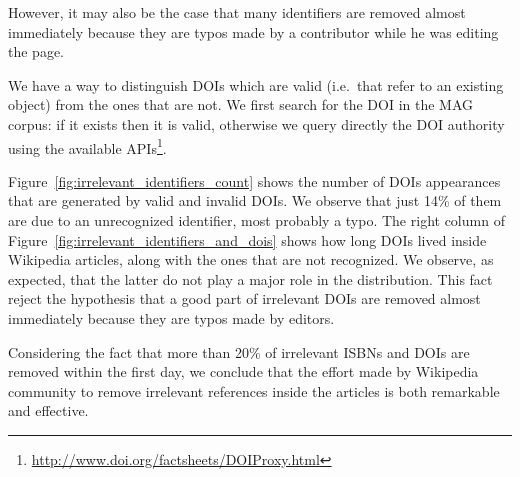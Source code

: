 However, it may also be the case that many identifiers are removed almost immediately because they are typos made by a contributor while he was editing the page.

We have a way to distinguish \acp{DOI} which are valid (i.e.\ that refer to an existing object) from the ones that are not.
We first search for the DOI in the MAG corpus: if it exists then it is valid, otherwise we query directly the DOI authority using the available APIs\footnote{\url{http://www.doi.org/factsheets/DOIProxy.html}}.


Figure~\ref{fig:irrelevant_identifiers_count} shows the number of \acp{DOI} appearances that are generated by valid and invalid DOIs.
We observe that just 14\% of them are due to an unrecognized identifier, most probably a typo.
The right column of Figure~\ref{fig:irrelevant_identifiers_and_dois} shows how long DOIs lived inside Wikipedia articles, along with the ones that are not recognized.
We observe, as expected, that the latter do not play a major role in the distribution.
This fact reject the hypothesis that a good part of irrelevant DOIs are removed almost immediately because they are typos made by editors.

Considering the fact that more than 20\% of irrelevant \acp{ISBN} and \acp{DOI} are removed within the first day, we conclude that the effort made by Wikipedia community to remove irrelevant references inside the articles is both remarkable and effective.

